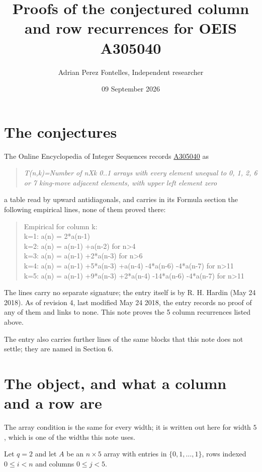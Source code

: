 \documentclass[11pt]{article}
\title{Proofs of the conjectured column and row recurrences for OEIS A305040}
\author{Adrian Perez Fontelles, Independent researcher}
\date{09 September 2026}
\theoremstyle{definition}
\begin{document}
\maketitle
\section{The conjectures}

The Online Encyclopedia of Integer Sequences records \href{https://oeis.org/A305040}{A305040} as

\begin{quote}\itshape T(n,k)=Number of nXk 0..1 arrays with every element unequal to 0, 1, 2, 6 or 7 king-move adjacent elements, with upper left element zero\end{quote}

a table read by upward antidiagonals, and carries in its Formula section the following empirical lines, none of them proved there:

\begin{quote}\ttfamily Empirical for column k:\\
k=1: a(n) = 2*a(n-1)\\k=2: a(n) = a(n-1) +a(n-2) for n>4\\k=3: a(n) = a(n-1) +2*a(n-3) for n>6\\k=4: a(n) = a(n-1) +5*a(n-3) +a(n-4) -4*a(n-6) -4*a(n-7) for n>11\\k=5: a(n) = a(n-1) +9*a(n-3) +2*a(n-4) -14*a(n-6) -4*a(n-7) for n>11\end{quote}

The lines carry no separate signature; the entry itself is by R. H. Hardin (May 24 2018). As of revision 4, last modified May 24 2018, the entry records no proof of any of them and links to none. This note proves the 5 column recurrences listed above.

The entry also carries further lines of the same blocks that this note does not settle; they are named in Section 6.

\section{The object, and what a column and a row are}

The array condition is the same for every width; it is written out here for width $5$, which is one of the widths this note uses.

Let $q = 2$ and let $A$ be an $n \times 5$ array with entries in $\{0,1,\dots,1\}$, rows indexed $0 \le i < n$ and columns $0 \le j < 5$.
\end{document}
